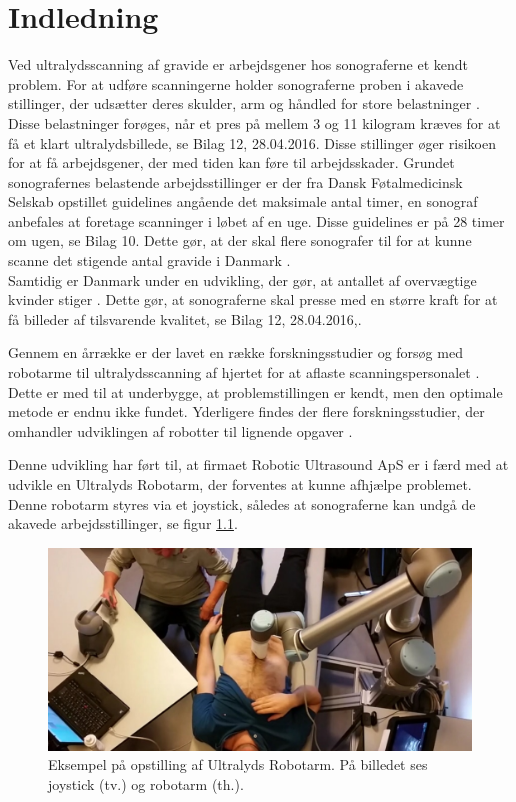 \chapter{Indledning} 
Ved ultralydsscanning af gravide er arbejdsgener hos sonograferne et kendt problem. For at udføre scanningerne holder sonograferne proben i akavede stillinger, der udsætter deres skulder, arm og håndled for store belastninger \cite{1}\cite{24}\cite{31}\cite{32}\cite{36}. Disse belastninger forøges, når et pres på mellem 3 og 11 kilogram kræves for at få et klart ultralydsbillede, se Bilag 12, 28.04.2016. Disse stillinger øger risikoen for at få arbejdsgener, der med tiden kan føre til arbejdsskader. Grundet sonografernes belastende arbejdsstillinger er der fra Dansk Føtalmedicinsk Selskab opstillet guidelines angående det maksimale antal timer, en sonograf anbefales at foretage scanninger i løbet af en uge. Disse guidelines er på 28 timer om ugen, se Bilag 10. Dette gør, at der skal flere sonografer til for at kunne scanne det stigende antal gravide i Danmark \cite{Foedsler}. \\
Samtidig er Danmark under en udvikling, der gør, at antallet af overvægtige kvinder stiger \cite{Overvaegt}. Dette gør, at sonograferne skal presse med en større kraft for at få billeder af tilsvarende kvalitet, se Bilag 12, 28.04.2016,\cite{24}\cite{31}\cite{8}. 

Gennem en årrække er der lavet en række forskningsstudier og forsøg med robotarme til ultralydsscanning af hjertet for at aflaste scanningspersonalet \cite{5}. Dette er med til at underbygge, at problemstillingen er kendt, men den optimale metode er endnu ikke fundet. Yderligere findes der flere forskningsstudier, der omhandler udviklingen af robotter til lignende opgaver \cite{8}\cite{5}\cite{18}. 

Denne udvikling har ført til, at firmaet Robotic Ultrasound ApS er i færd med at udvikle en Ultralyds Robotarm, der forventes at kunne afhjælpe problemet. Denne robotarm styres via et joystick, således at sonograferne kan undgå de akavede arbejdsstillinger, se figur \ref{opstilling}.  

\begin{figure}[H]\centering
	\includegraphics[width = 1.0\textwidth]{Figurer/ergonomiskLosning.jpg}
	\caption{Eksempel på opstilling af Ultralyds Robotarm. På billedet ses joystick (tv.) og robotarm (th.).  }
	\label{opstilling}
\end{figure}

